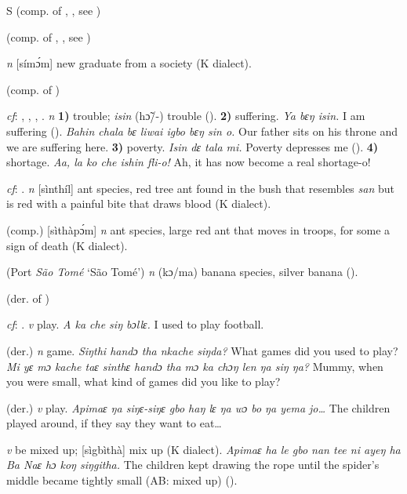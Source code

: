 \begin{letter}{S}
 (comp. of , , see ) 

 (comp. of , , see ) 

 \textit{n} [símɔ́m] new graduate from a society (K dialect). 

 (comp. of ) 

 \textit{cf}: , , , . \textit{n} \textbf{1)} trouble; \textit{isin} (hɔ̃/-) trouble (\citealt{Pichl1967}). \textbf{2)} suffering. \textit{Ya bɛŋ isin.} I am suffering (\citealt{Pichl1967}). \textit{Bahin chala bɛ liwai igbo bɛŋ sin o.} Our father sits on his throne and we are suffering here. \textbf{3)} poverty. \textit{Isin dɛ tala mi.} Poverty depresses me (\citealt{Pichl1967}). \textbf{4)} shortage. \textit{Aa, la ko che ishin fli-o!} Ah, it has now become a real shortage-o! 

 \textit{cf}: . \textit{n} [sìnthíl] ant species, red tree ant found in the bush that resembles \textit{san} but is red with a painful bite that draws blood (K dialect). 

 (comp.) [sìthàpɔ́m] \textit{n} ant species, large red ant that moves in troops, for some a sign of death (K dialect). 

 (Port \textit{São Tomé} ‘São Tomé') \textit{n} (kɔ/ma) banana species, silver banana (\citealt{Pichl1967}). 

 (der. of ) 

 \textit{cf}: . \textit{v} play. \textit{A ka che siŋ bɔllɛ.} I used to play football.

 (der.) \textit{n} game. \textit{Siŋthi handɔ tha nkache siŋda?} What games did you used to play? \textit{Mi yɛ mɔ kache taɛ sinthɛ handɔ tha mɔ ka chɔŋ len ŋa siŋ ŋa?} Mummy, when you were small, what kind of games did you like to play?

 (der.) \textit{v} play. \textit{Apimaɛ ŋa siŋɛ-siŋɛ gbo haŋ lɛ ŋa wɔ bo ŋa yema jo…} The children played around, if they say they want to eat…

 \textit{v} be mixed up; [sìgbìthà] mix up (K dialect). \textit{Apimaɛ ha le gbo nan tee ni ayeŋ ha Ba Naɛ hɔ koŋ siŋgitha.} The children kept drawing the rope until the spider's middle became tightly small (AB: mixed up) (\citealt{Sumner1921}).


\end{letter}
